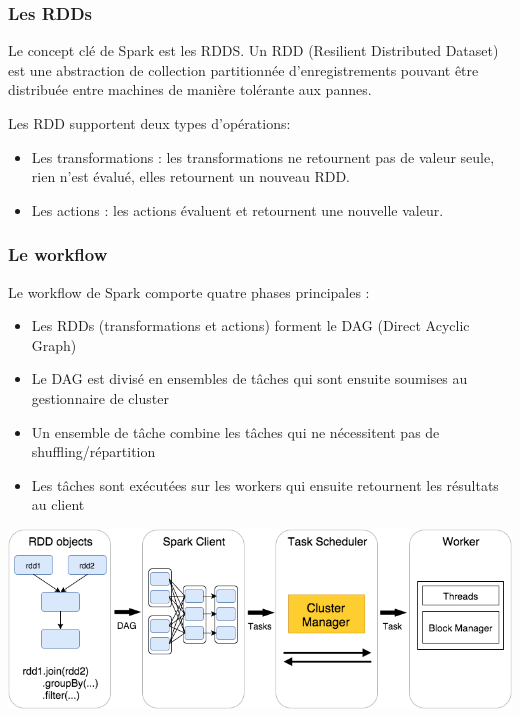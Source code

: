 \documentclass[a4paper, 11pt, titlepage]{article}
\begin{document}
\subsubsection* {Les RDDs}


Le concept clé de Spark est les RDDS. Un RDD (Resilient Distributed Dataset) est une abstraction de collection partitionnée d'enregistrements pouvant être distribuée entre machines de manière tolérante aux pannes.


Les RDD supportent deux types d'opérations:

\begin{itemize}

\item
Les transformations : les transformations ne retournent pas de valeur seule, rien n'est évalué, elles retournent un nouveau RDD.

\item
Les actions : les actions évaluent et retournent une nouvelle valeur.

\end{itemize}



\subsubsection* {Le workflow}


Le workflow de Spark comporte quatre phases principales :

\begin{itemize}

\item
Les RDDs (transformations et actions) forment le DAG (Direct Acyclic Graph)

\item
Le DAG est divisé en ensembles de tâches qui sont ensuite soumises au gestionnaire de cluster

\item
Un ensemble de tâche combine les tâches qui ne nécessitent pas de shuffling/répartition

\item
Les tâches sont exécutées sur les workers qui ensuite retournent les résultats au client

\end{itemize}


\begin{center}
\includegraphics[scale=0.5]{res/workflow_spark.png}
\end{center}
\end{document}
